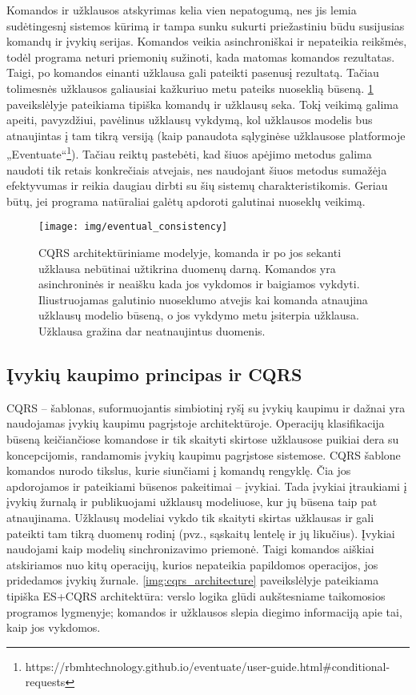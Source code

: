 Komandos ir užklausos atskyrimas kelia vien nepatogumą, nes jis lemia sudėtingesnį sistemos kūrimą ir tampa sunku sukurti priežastiniu būdu susijusias komandų ir įvykių serijas. Komandos veikia asinchroniškai ir nepateikia reikšmės, todėl programa neturi priemonių sužinoti, kada matomas komandos rezultatas. Taigi, po komandos einanti užklausa gali pateikti pasenusį rezultatą. Tačiau tolimesnės užklausos galiausiai kažkuriuo metu pateiks nuoseklią būseną. \ref{img:eventual_consistency} paveikslėlyje pateikiama tipiška komandų ir užklausų seka. Tokį veikimą galima apeiti, pavyzdžiui, pavėlinus užklausų vykdymą, kol užklausos modelis bus atnaujintas į tam tikrą versiją (kaip panaudota sąlyginėse užklausose platformoje „Eventuate“\footnote{https://rbmhtechnology.github.io/eventuate/user-guide.html\#conditional-requests}). Tačiau reiktų pastebėti, kad šiuos apėjimo metodus galima naudoti tik retais konkrečiais atvejais, nes naudojant šiuos metodus sumažėja efektyvumas ir reikia daugiau dirbti su šių sistemų charakteristikomis. Geriau būtų, jei programa natūraliai galėtų apdoroti galutinai nuoseklų veikimą.

\begin{figure}[H]
    \centering
    \texttt{[image: img/eventual\_consistency]}
    \caption{CQRS architektūriniame modelyje, komanda ir po jos sekanti užklausa nebūtinai užtikrina duomenų darną. Komandos yra asinchroninės ir neaišku kada jos vykdomos ir baigiamos vykdyti. Iliustruojamas galutinio nuoseklumo atvejis kai komanda atnaujina užklausų modelio būseną, o jos vykdymo metu įsiterpia užklausa. Užklausa gražina dar neatnaujintus duomenis.}
    \label{img:eventual_consistency}
\end{figure}

\subsection{Įvykių kaupimo principas ir CQRS}

CQRS – šablonas, suformuojantis simbiotinį ryšį su įvykių kaupimu ir dažnai yra naudojamas įvykių kaupimu pagrįstoje architektūroje. Operacijų klasifikacija būseną keičiančiose komandose ir tik skaityti skirtose užklausose puikiai dera su koncepcijomis, randamomis įvykių kaupimu pagrįstose sistemose. CQRS šablone komandos nurodo tikslus, kurie siunčiami į komandų rengyklę. Čia jos apdorojamos ir pateikiami būsenos pakeitimai – įvykiai. Tada įvykiai įtraukiami į įvykių žurnalą ir publikuojami užklausų modeliuose, kur jų būsena taip pat atnaujinama. Užklausų modeliai vykdo tik skaityti skirtas užklausas ir gali pateikti tam tikrą duomenų rodinį (pvz., sąskaitų lentelę ir jų likučius). Įvykiai naudojami kaip modelių sinchronizavimo priemonė. Taigi komandos aiškiai atskiriamos nuo kitų operacijų, kurios nepateikia papildomos operacijos, jos pridedamos įvykių žurnale. \ref{img:cqrs_architecture} paveikslėlyje pateikiama tipiška ES+CQRS architektūra: verslo logika glūdi aukštesniame taikomosios programos lygmenyje; komandos ir užklausos slepia diegimo informaciją apie tai, kaip jos vykdomos.

